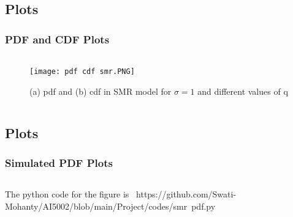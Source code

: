 \documentclass{beamer}
\begin{document}
\subsection{Plots}
\begin{frame}
\frametitle{PDF and CDF Plots }
\footnotesize
\label{a}
\begin{columns}
\begin{column}{.8\textwidth}
\begin{figure}[h]
\renewcommand{\theenumi}{1}
\centering
\texttt{[image: pdf cdf smr.PNG]}
\caption{(a) pdf and (b) cdf in SMR model for $\sigma = 1$ and different values of q }
\label{Fig:1}
\end{figure}
\end{column}

\end{columns}

\end{frame}

\subsection{Plots}
\begin{frame}
\frametitle{Simulated PDF Plots }
\footnotesize
\label{b}
\begin{columns}

\end{columns}
The python code for the figure is
\hbox{
https://github.com/Swati-Mohanty/AI5002/blob/main/Project/codes/smr pdf.py}
\end{frame}
\end{document}
